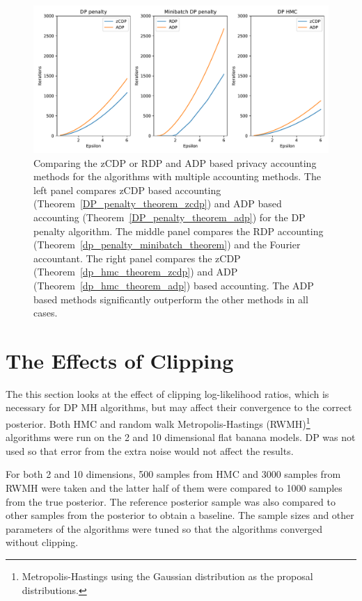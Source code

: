 \documentclass[english,twoside,openright]{HYgraduMLDS}
\begin{document}
\begin{figure}[h]
	\centering
  \includegraphics[width=\textwidth]{figures/accountant_comparison}
  \caption{
    Comparing the zCDP or RDP and ADP based privacy accounting methods
    for the algorithms with multiple accounting methods. The left panel
    compares zCDP based accounting (Theorem~\ref{DP_penalty_theorem_zcdp})
    and ADP based accounting (Theorem~\ref{DP_penalty_theorem_adp}) for
    the DP penalty algorithm. The middle panel compares the RDP accounting
    (Theorem~\ref{dp_penalty_minibatch_theorem}) and the Fourier accountant.
    The right panel compares the zCDP (Theorem~\ref{dp_hmc_theorem_zcdp})
    and ADP (Theorem~\ref{dp_hmc_theorem_adp}) based accounting.
    The ADP based methods significantly outperform the other methods
    in all cases.
  }
  \label{accounting_comparison_fig}
\end{figure}

\section{The Effects of Clipping}\label{clipping_experiments}

The this section looks at the effect of clipping log-likelihood ratios,
which is necessary for DP MH algorithms, but may affect their convergence
to the correct posterior.
Both HMC and random walk Metropolis-Hastings (RWMH)\footnote{Metropolis-Hastings using the Gaussian
distribution as the proposal distributions.}
algorithms were run on the 2 and 10 dimensional flat banana models.
DP was not used so that error from the extra noise would not affect the results.

For both 2 and 10 dimensions, 500 samples from HMC and 3000 samples from
RWMH were taken and the latter half of them were
compared to 1000 samples from the true posterior. The reference posterior sample
was also compared to other samples from the posterior to obtain a baseline.
The sample sizes and other parameters of the algorithms were tuned so that
the algorithms converged without clipping.
\end{document}
